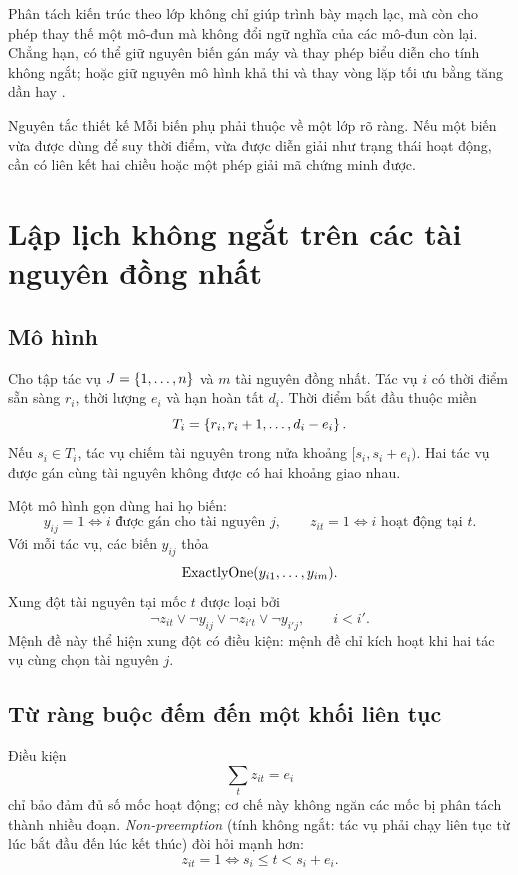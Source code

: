 Phân tách kiến trúc theo lớp không chỉ giúp trình bày mạch lạc, mà còn cho phép thay thế một mô-đun mà không
đổi ngữ nghĩa của các mô-đun còn lại. Chẳng hạn, có thể giữ nguyên biến gán
máy và thay phép biểu diễn cho tính không ngắt; hoặc giữ nguyên mô hình khả thi
và thay vòng lặp tối ưu bằng \SAT tăng dần hay \MaxSAT.

\begin{designrule}{Nguyên tắc thiết kế}
Mỗi biến phụ phải thuộc về một lớp rõ ràng. Nếu một biến vừa được dùng để suy
thời điểm, vừa được diễn giải như trạng thái hoạt động, cần có liên kết hai
chiều hoặc một phép giải mã chứng minh được.
\end{designrule}

\section{Lập lịch không ngắt trên các tài nguyên đồng nhất}

\subsection{Mô hình}

Cho tập tác vụ \(J=\left\{1,\ldots,n\right\}\) và \(m\) tài nguyên đồng nhất. Tác vụ
\(i\) có thời điểm sẵn sàng \(r_i\), thời lượng \(e_i\) và hạn hoàn tất
\(d_i\). Thời điểm bắt đầu thuộc miền
\[
  T_i=\left\{r_i,r_i+1,\ldots,d_i-e_i\right\}.
\]
Nếu \(s_i\in T_i\), tác vụ chiếm tài nguyên trong nửa khoảng
\([s_i,s_i+e_i)\). Hai tác vụ được gán cùng tài nguyên không được có hai khoảng
giao nhau.

Một mô hình gọn dùng hai họ biến:
\[
  y_{ij}=1 \iff i\text{ được gán cho tài nguyên }j,
  \qquad
  z_{it}=1 \iff i\text{ hoạt động tại }t .
\]
Với mỗi tác vụ, các biến \(y_{ij}\) thỏa
\[
  \operatorname{ExactlyOne}(y_{i1},\ldots,y_{im}).
\]
Xung đột tài nguyên tại mốc \(t\) được loại bởi
\[
  \neg z_{it}\lor \neg y_{ij}\lor
  \neg z_{i't}\lor \neg y_{i'j},
  \qquad i<i'.
\]
Mệnh đề này thể hiện xung đột có điều kiện: mệnh đề chỉ kích hoạt khi hai tác vụ cùng
chọn tài nguyên \(j\).

\subsection{Từ ràng buộc đếm đến một khối liên tục}

Điều kiện
\[
  \sum_t z_{it}=e_i
\]
chỉ bảo đảm đủ số mốc hoạt động; cơ chế này không ngăn các mốc bị phân tách thành nhiều
đoạn. \emph{Non-preemption} (tính không ngắt: tác vụ phải chạy liên tục từ
lúc bắt đầu đến lúc kết thúc) đòi hỏi mạnh hơn:
\[
  z_{it}=1 \iff s_i\le t<s_i+e_i .
\]

